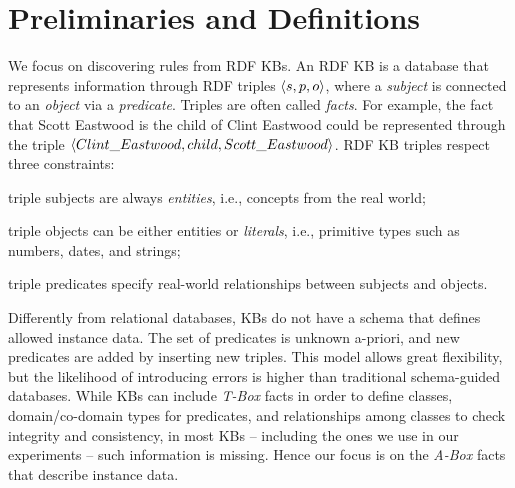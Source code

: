 \vspace{-0.5ex}
\section{Preliminaries and Definitions} \label{sec:krd_prel}
We focus on discovering rules from RDF KBs. An RDF KB is
a database that represents information through RDF triples $\langle s,p,o\rangle$, where a \emph{subject} is connected to an \emph{object} via a \emph{predicate}. Triples are often called \emph{facts}. For example, the fact that Scott Eastwood is the child of Clint Eastwood could be represented through the triple $\langle Clint\_Eastwood,child,Scott\_Eastwood\rangle$. 
RDF KB triples respect three constraints:
\begin{inparaenum}[(i)]
	\item triple subjects are always \emph{entities}, i.e., concepts from the real world;
	\item triple objects can be either entities or \emph{literals}, i.e.,  primitive types such as numbers, dates, and strings;
	\item triple predicates specify real-world relationships between subjects and objects.
\end{inparaenum}

Differently from relational databases, KBs do not have a schema that defines allowed instance data. 
The set of predicates is unknown a-priori, and new predicates are added by inserting new triples. %
This model allows great flexibility, but the likelihood of introducing errors is higher than traditional schema-guided databases.
While KBs can include \emph{T-Box} facts in order to define classes, domain/co-domain types for predicates, and relationships among classes
to check integrity and consistency, in most KBs -- including the ones we use in our experiments -- such information is missing. %
Hence our focus is on the \emph{A-Box} facts that describe instance data. 

